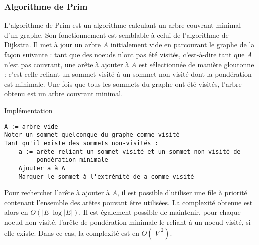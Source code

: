 \documentclass[11pt,a4paper]{article}
\begin{document}
    \subsubsection{Algorithme de Prim}
L'algorithme de Prim est un algorithme calculant un arbre couvrant minimal d'un graphe. Son fonctionnement est semblable à celui de l'algorithme de Dijkstra. Il met à jour un arbre \(A\) initialement vide en parcourant le graphe de la façon suivante : tant que des noeuds n'ont pas été visités, c'est-à-dire tant que \(A\) n'est pas couvrant, une arête à ajouter à \(A\) est sélectionnée de manière gloutonne : c'est celle reliant un sommet visité à un sommet non-visité dont la pondération est minimale. Une fois que tous les sommets du graphe ont été visités, l'arbre obtenu est un arbre couvrant minimal.

\noindent\href{https://github.com/AdrienVannson/algo-lib/blob/master/include/graphs/algorithms/prim.hpp}{Implémentation}
\begin{lstlisting}
A := arbre vide
Noter un sommet quelconque du graphe comme visité
Tant qu'il existe des sommets non-visités :
    a := arête reliant un sommet visité et un sommet non-visité de
         pondération minimale
    Ajouter a à A
    Marquer le sommet à l'extrémité de a comme visité
\end{lstlisting}

Pour rechercher l'arête à ajouter à \(A\), il est possible d'utiliser une file à priorité contenant l'ensemble des arêtes pouvant être utilisées. La complexité obtenue est alors en \(O(|E|\log|E|)\). Il est également possible de maintenir, pour chaque noeud non-visité, l'arête de pondération minimale le reliant à un noeud visité, si elle existe. Dans ce cas, la complexité est en \(O(|V|^2)\).
\end{document}
